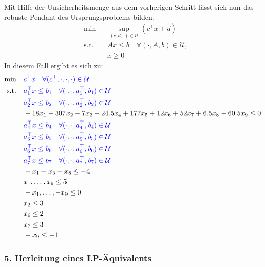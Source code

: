 \documentclass[a4paper,12pt]{article}
\begin{document}
Mit Hilfe der Unsicherheitsmenge aus dem vorherigen Schritt l\"asst sich nun das robuste Pendant des Ursprungsproblems bilden:
\[
\begin{aligned}
    &\min && \sup_{(c, d, \cdot) \in \mathcal{U}} \left(c^\top x + d\right) \\
    &\text{s.t.} && Ax \leq b \quad \forall (\cdot, A, b) \in \mathcal{U}, \\
    & && x \geq 0
\end{aligned}
\]
In diesem Fall ergibt es sich zu:
\[
\begin{aligned}
   \begin{aligned}
    \min & \quad \textcolor{blue}{c^\top x \quad \forall (c^\top, \cdot,\cdot,\cdot) \in \mathcal{U}} \\ %
    \text{s.t.} & \quad \textcolor{blue}{a_1^\top x \leq b_1 \quad \forall (\cdot, \cdot, a_1^\top, b_1) \in \mathcal{U}} \\
    & \quad \textcolor{blue}{a_2^\top x \leq b_2 \quad \forall (\cdot, \cdot, a_2^\top, b_2) \in \mathcal{U}} \\
    & \quad -18x_1 - 307x_2 - 7x_3 - 24.5x_4 + 177x_5 + 12x_6 + 52x_7 + 6.5x_8 + 60.5x_9 \leq 0 \\
    & \quad \textcolor{blue}{a_4^\top x \leq b_4 \quad \forall (\cdot, \cdot, a_4^\top, b_4) \in \mathcal{U}} \\
    & \quad \textcolor{blue}{a_5^\top x \leq b_5 \quad \forall (\cdot, \cdot, a_5^\top, b_5) \in \mathcal{U}} \\
    & \quad \textcolor{blue}{a_6^\top x \leq b_6 \quad \forall (\cdot, \cdot, a_6^\top, b_6) \in \mathcal{U}} \\
    & \quad \textcolor{blue}{a_7^\top x \leq b_7 \quad \forall (\cdot, \cdot, a_7^\top, b_7) \in \mathcal{U}}\\
    & \quad -x_1 - x_3 - x_8 \leq -4 \\
    & \quad x_1, \dots, x_9 \leq 5 \\
    & \quad - x_1, \dots, - x_9 \leq 0 \\
    & \quad x_2 \leq 3 \\
    & \quad x_6 \leq 2 \\
    & \quad x_7 \leq 3 \\
    & \quad - x_9 \leq - 1
\end{aligned}
\end{aligned}
\]

\subsubsection*{5. Herleitung eines LP-\"Aquivalents}
\end{document}
